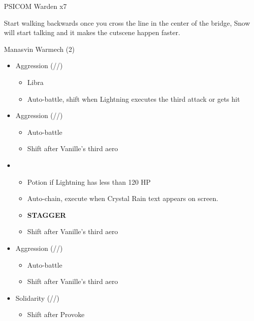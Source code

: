 	\renewcommand{\second}{[2] Solidarity (\com/\sen/\med)}

	\renewcommand{\third}{[3] Aggression (\com/\com/\rav)}

	\renewcommand{\fourth}{[4] Aggression (\com/\com/\rav)}

	\begin{battle}[0:02]{PSICOM Warden x7}
		 
	\end{battle}
	
	Start walking backwards once you cross the line in the center of the bridge, Snow will start talking and it makes the cutscene happen faster.

	\begin{battle}[0:52]{Manasvin Warmech (2)}
		\begin{itemize}
			\item \third
			      \begin{itemize}
				      \item Libra
				      \item Auto-battle, shift when Lightning executes the third attack or gets hit
			      \end{itemize}
			\item \fourth
			      \begin{itemize}
				      \item Auto-battle
				      \item Shift after Vanille's third aero
			      \end{itemize}
			\item \first
			      \begin{itemize}
				      \item Potion if Lightning has less than 120 HP
				      \item Auto-chain, execute when Crystal Rain text appears on screen.
				      \item \textbf{STAGGER}
				      \item Shift after Vanille's third aero
			      \end{itemize}
			\item \third
			      \begin{itemize}
				      \item Auto-battle
				      \item Shift after Vanille's third aero
			      \end{itemize}
			\item \second
			      \begin{itemize}
				      \item Shift after Provoke

\end{itemize}
\end{itemize}
\end{battle}
